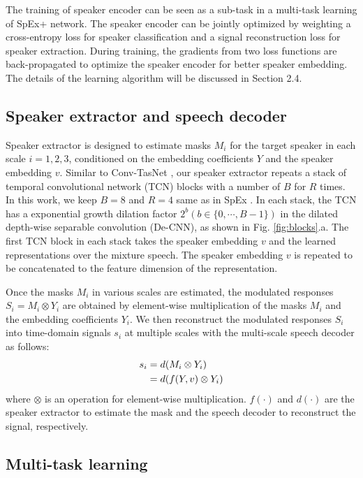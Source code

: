 \documentclass[a4paper]{article}
\begin{document}
The training of speaker encoder can be seen as a sub-task in a multi-task learning \cite{spex2020} of SpEx+ network. The speaker encoder can be jointly optimized by weighting a cross-entropy loss for speaker classification and a signal reconstruction loss \cite{wu2019time} for speaker extraction. During training, the gradients from two loss functions are back-propagated to optimize the speaker encoder for better speaker embedding. The details of the learning algorithm will be discussed in Section 2.4.


\subsection{Speaker extractor and speech decoder}

Speaker extractor is designed to estimate masks $M_i$ for the target speaker in each scale $i=1,2,3$, conditioned on the embedding coefficients $Y$ and the speaker embedding $v$. Similar to Conv-TasNet \cite{luo2019conv}, our speaker extractor repeats a stack of temporal convolutional network (TCN) blocks with a number of $B$ for $R$ times. In this work, we keep $B=8$ and $R=4$ same as in SpEx \cite{spex2020}. In each stack, the TCN has a exponential growth dilation factor $2^b (b \in \{0,\cdots,B-1\})$ in the dilated depth-wise separable convolution (De-CNN), as shown in Fig. \ref{fig:blocks}.a. The first TCN block in each stack takes the speaker embedding $v$ and the learned representations over the mixture speech. The speaker embedding $v$ is repeated to be concatenated to the feature dimension of the representation. 

Once the masks $M_i$ in various scales are estimated, the modulated responses $S_i=M_i \otimes Y_i$ are obtained by element-wise multiplication of the masks $M_i$ and the embedding coefficients $Y_i$. We then reconstruct the modulated responses $S_i$ into time-domain signals $s_i$ at multiple scales with the multi-scale speech decoder as follows:
\begin{align}
s_i &=d(M_i \otimes Y_i) \notag\\
     &=d(f(Y, v) \otimes Y_i)
\end{align}
where $\otimes$ is an operation for element-wise multiplication. $f(\cdot)$ and $d(\cdot)$ are the speaker extractor to estimate the mask and the speech decoder to reconstruct the signal, respectively.

\subsection{Multi-task learning}
\end{document}

